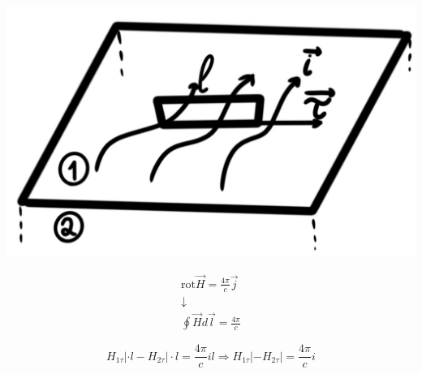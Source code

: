 \begin{minipage}[c]{0.4\textwidth} %
    \includegraphics[width=\textwidth]{im/74.png} %
\end{minipage}%
\hfill
\begin{minipage}[c]{0.6\textwidth} %
    \begin{gather*}
        \mathrm{rot}\vec{H}=\frac{4\pi}{c}\vec{j}  \\
        \downarrow \\
        \oint \vec{H}d\vec{l}=\frac{4\pi}{c} 
    \end{gather*}
\end{minipage}

\[
H_{1\tau}|\cdot l -H_{2\tau}|\cdot l=\frac{4\pi}{c}il \Rightarrow \boxed{H_{1\tau}|-H_{2\tau}|=\frac{4\pi}{c}i } 
\]